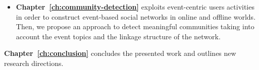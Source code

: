 \begin{enumerate}
\begin{itemize}
\item \textbf{Chapter~\ref{ch:community-detection}} exploits event-centric users activities in order to construct event-based social networks in online and offline worlds. Then, we propose an approach to detect meaningful communities taking into account the event topics and the linkage structure of the network.
\end{itemize}

\end{enumerate}

\textbf{Chapter~\ref{ch:conclusion}} concludes the presented work and outlines new research directions.
